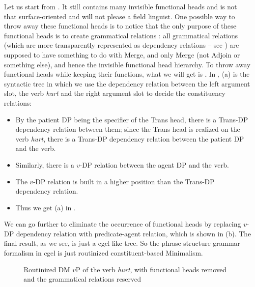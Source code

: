 \documentclass[../main.tex]{subfiles}
\begin{document}
Let us start from . It still contains many invisible functional heads and is not 
that surface-oriented and will not please a field linguist. One possible way to throw away these functional
heads is to notice that the only purpose of these functional heads is to create grammatical relations \citep{hornstein2021extended}: all grammatical relations (which are more transparently represented as dependency 
relations -- see ) are supposed to have something to do with Merge, 
and only Merge (not Adjoin or something else), and hence the invisible functional head hierarchy.
To throw away functional heads while keeping their functions, what we will get is . In , (a) is the syntactic tree in which 
we use the dependency relation between the left argument slot, the verb \emph{hurt} and the right 
argument slot to decide the constituency relations:
\begin{itemize}
    \item By the patient DP being the specifier of the Trans head, there is a Trans-DP dependency relation between them; since the Trans head is realized on the verb \emph{hurt}, there is a Trans-DP dependency relation between the patient DP and the verb. %
    \item Similarly, there is a $v$-DP relation between the agent DP and the verb.
    \item The $v$-DP relation is built in a higher position than the Trans-DP dependency relation.
    \item Thus we get (a) in .
\end{itemize}
We can go further to eliminate the occurrence of functional heads by replacing $v$-DP dependency relation 
with predicate-agent relation, which is shown in (b). The final result, as we see, is just a \ac{cgel}-like 
tree. So the phrase structure grammar formalism in \ac{cgel} is just routinized constituent-based Minimalism.

\begin{figure}
    \centering
    

    \caption{Routinized DM $v$P of the verb \emph{hurt}, with functional heads removed and the grammatical relations reserved}
    \label{fig:hurt-constituent-tree}
\end{figure}
\end{document}
